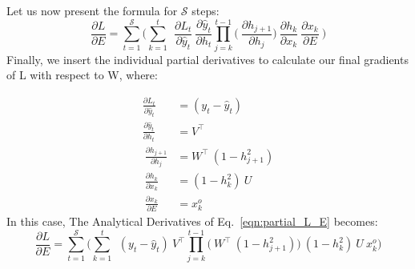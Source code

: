 \documentclass{article}
\begin{document}
Let us now present the formula for $\mathcal{S}$ steps:
\begin{equation}
	\frac{\partial L}{ \partial{E}} = \sum_{t=1}^{\mathcal{S}} 
	\bigg(	
	 \sum_{k=1}^{t} ~
	~\frac{\partial L_t}{\partial \hat{y}_t}
	~\frac{\partial \hat{y}_t}{\partial h_t}
        \prod_{j=k}^{t-1} \bigg(
	~\frac{\partial h_{j+1}}{\partial h_{j}}
        \bigg)
	~\frac{\partial h_k}{\partial x_k}~\frac{\partial x_k}{\partial E}~
	\bigg) 
 \label{eqn:partial_L_E}
\end{equation}
Finally, we insert the individual partial derivatives to calculate our final gradients of L with respect to W, where:

\begin{align*}
        \frac{\partial L_t}{\partial \hat{y}_t} &= (y_t - \hat{y}_t)\\
        \frac{\partial \hat{y}_t}{\partial h_t}
        &= V^\top \\
        ~\frac{\partial h_{j+1}}{\partial h_{j}}
        &= W^\top ~ (1 - h_{j+1}^2) \\
        ~\frac{\partial h_k}{\partial x_k}&= (1-h_k^2)~ U \\
        ~\frac{\partial x_k}{\partial E}&= x^o_k
\end{align*}
In this case, The Analytical Derivatives of Eq.~\eqref{eqn:partial_L_E} becomes:
\begin{equation}
	\frac{\partial L}{ \partial{E}} = \sum_{t=1}^{\mathcal{S}} 
	\bigg(	
	 \sum_{k=1}^{t} ~
	~(y_t - \hat{y}_t)
	~V^\top
        \prod_{j=k}^{t-1} \bigg(
	~W^\top ~ (1 - h_{j+1}^2)
        \bigg)
	~(1-h_k^2)~ U~ x^o_k
	\bigg) 
 \label{eqn:partial_L_aE}
\end{equation}
\end{document}
